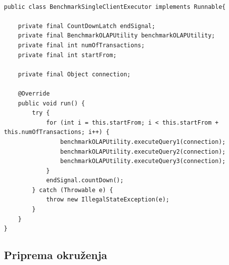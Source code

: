 \documentclass[12pt,oneside]{memoir}
\begin{document}
\begin{lstlisting}[title={hbase-setup-model},captionpos=t]

public class BenchmarkSingleClientExecutor implements Runnable{

    private final CountDownLatch endSignal;
    private final BenchmarkOLAPUtility benchmarkOLAPUtility;
    private final int numOfTransactions;
    private final int startFrom;

    private final Object connection;

    @Override
    public void run() {
        try {
            for (int i = this.startFrom; i < this.startFrom + this.numOfTransactions; i++) {
                benchmarkOLAPUtility.executeQuery1(connection);
                benchmarkOLAPUtility.executeQuery2(connection);
                benchmarkOLAPUtility.executeQuery3(connection);
            }
            endSignal.countDown();
        } catch (Throwable e) {
            throw new IllegalStateException(e);
        }
    }
}

\end{lstlisting}

\subsection{Priprema okruženja}

\end{document}
